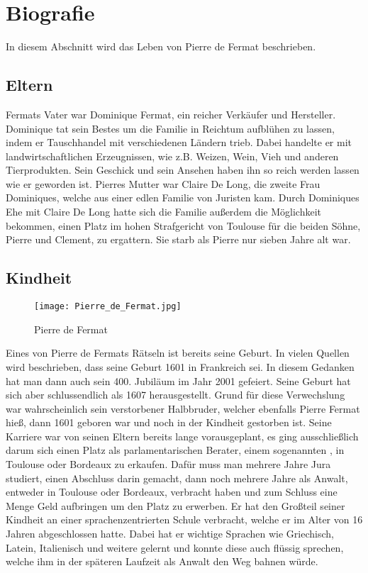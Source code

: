 \section{Biografie} \label{sec:bio}
In diesem Abschnitt wird das Leben von Pierre de Fermat beschrieben.

\subsection{Eltern} \label{sec:eltern}
Fermats Vater war Dominique Fermat, ein reicher Verkäufer und Hersteller. Dominique tat sein Bestes um die Familie in Reichtum aufblühen zu lassen, indem er Tauschhandel mit verschiedenen Ländern trieb. Dabei handelte er mit landwirtschaftlichen Erzeugnissen, wie z.B. Weizen, Wein, Vieh und anderen Tierprodukten. Sein Geschick und sein Ansehen haben ihn so reich werden lassen wie er geworden ist. Pierres Mutter war Claire De Long, die zweite Frau Dominiques, welche aus einer edlen Familie von Juristen kam. Durch Dominiques Ehe mit Claire De Long hatte sich die Familie außerdem die Möglichkeit bekommen, einen Platz im hohen Strafgericht von Toulouse für die beiden Söhne, Pierre und Clement, zu ergattern. Sie starb als Pierre nur sieben Jahre alt war.

\subsection{Kindheit} \label{sec:kindheit}

\begin{wrapfigure}{r}{0.25\textwidth}
    \centering
    \texttt{[image: Pierre\_de\_Fermat.jpg]}
    \caption{Pierre de Fermat \cite{imgFermat}}
    \label{fig:fermat}
\end{wrapfigure}

Eines von Pierre de Fermats Rätseln ist bereits seine Geburt. In vielen Quellen wird beschrieben, dass seine Geburt 1601 in Frankreich sei. In diesem Gedanken hat man dann auch sein 400. Jubiläum im Jahr 2001 gefeiert. Seine Geburt hat sich aber schlussendlich als 1607 herausgestellt. \cite{whenWasFermatBorn} Grund für diese Verwechslung war wahrscheinlich sein verstorbener Halbbruder, welcher ebenfalls Pierre Fermat hieß, dann 1601 geboren war und noch in der Kindheit gestorben ist. \cite{famousScientistsFermat} Seine Karriere war von seinen Eltern bereits lange vorausgeplant, es ging ausschließlich darum sich einen Platz als parlamentarischen Berater, einem sogenannten \textit{}, in Toulouse oder Bordeaux zu erkaufen. Dafür muss man mehrere Jahre Jura studiert, einen Abschluss darin gemacht, dann noch mehrere Jahre als Anwalt, entweder in Toulouse oder Bordeaux, verbracht haben und zum Schluss eine Menge Geld aufbringen um den Platz zu erwerben. Er hat den Großteil seiner Kindheit an einer sprachenzentrierten Schule verbracht, welche er im Alter von 16 Jahren abgeschlossen hatte. Dabei hat er wichtige Sprachen wie Griechisch, Latein, Italienisch und weitere gelernt und konnte diese auch flüssig sprechen, welche ihm in der späteren Laufzeit als Anwalt den Weg bahnen würde.

